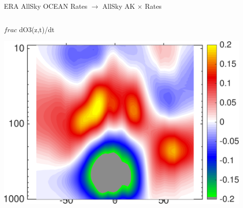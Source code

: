 \documentclass[10pt,t]{beamer}
\begin{document}
\begin{frame}{ERA AllSky OCEAN Rates $\rightarrow$ AllSky AK $\times$ Rates}
\vspace{-0.25in}

\begin{columns}
\begin{column}{0.45\columnwidth}
\begin{block}{\footnotesize $frac$ dO3(z,t)/dt}
\vspace{-0.1in}
\begin{center}
\includegraphics[width=\linewidth]{Figs/CloudAnom/Desc_ocean/ak_x_ERAo3rates.png}
\end{center}
\end{block}
\end{column}

\begin{column}{0.45\columnwidth}

\end{column}
\end{columns}
\end{frame}

\end{document}
